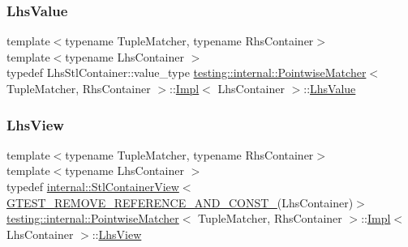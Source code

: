 \mbox{\label{classtesting_1_1internal_1_1_pointwise_matcher_1_1_impl_a453769e721f4212e399f76c980b4b65c}} 
\subsubsection{\texorpdfstring{Lhs\+Value}{LhsValue}}
{\footnotesize\ttfamily template$<$typename Tuple\+Matcher, typename Rhs\+Container$>$ \\
template$<$typename Lhs\+Container $>$ \\
typedef Lhs\+Stl\+Container\+::value\+\_\+type \hyperlink{classtesting_1_1internal_1_1_pointwise_matcher}{testing\+::internal\+::\+Pointwise\+Matcher}$<$ Tuple\+Matcher, Rhs\+Container $>$\+::\hyperlink{classtesting_1_1internal_1_1_pointwise_matcher_1_1_impl}{Impl}$<$ Lhs\+Container $>$\+::\hyperlink{classtesting_1_1internal_1_1_pointwise_matcher_1_1_impl_a453769e721f4212e399f76c980b4b65c}{Lhs\+Value}}

\mbox{\label{classtesting_1_1internal_1_1_pointwise_matcher_1_1_impl_a5240abc710bb0a5bedfd180bf6701fae}} 
\subsubsection{\texorpdfstring{Lhs\+View}{LhsView}}
{\footnotesize\ttfamily template$<$typename Tuple\+Matcher, typename Rhs\+Container$>$ \\
template$<$typename Lhs\+Container $>$ \\
typedef \hyperlink{classtesting_1_1internal_1_1_stl_container_view}{internal\+::\+Stl\+Container\+View}$<$ \hyperlink{gtest-internal_8h_a874567b176266188fabfffb8393267ce}{G\+T\+E\+S\+T\+\_\+\+R\+E\+M\+O\+V\+E\+\_\+\+R\+E\+F\+E\+R\+E\+N\+C\+E\+\_\+\+A\+N\+D\+\_\+\+C\+O\+N\+S\+T\+\_\+}(Lhs\+Container)$>$ \hyperlink{classtesting_1_1internal_1_1_pointwise_matcher}{testing\+::internal\+::\+Pointwise\+Matcher}$<$ Tuple\+Matcher, Rhs\+Container $>$\+::\hyperlink{classtesting_1_1internal_1_1_pointwise_matcher_1_1_impl}{Impl}$<$ Lhs\+Container $>$\+::\hyperlink{classtesting_1_1internal_1_1_pointwise_matcher_1_1_impl_a5240abc710bb0a5bedfd180bf6701fae}{Lhs\+View}}



